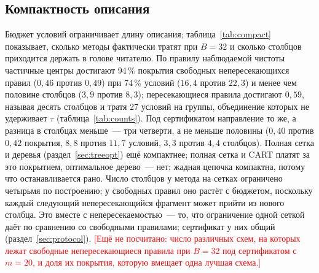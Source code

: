 \documentclass[11pt]{article}
\newcommand{\todo}[1]{\textcolor{red}{[#1]}}
\begin{document}
\subsection{Компактность описания}\label{sec:compact}
\begin{table}[t]\centering\small
\caption{Компактность при $B=32$ по информативным конфигурациям, на которых запускались все методы (\texttt{experiments/compactness.py}). Покрытие и потраченные условия~--- средние на отложенных строках по всем разбиениям; группы и различные столбцы, названные описанием, считаются на первом разбиении, поскольку набор столбцов не записывается по разбиениям. Дерево и SSD++ не записывают метки столбцов.}\label{tab:compact}

\end{table}

Бюджет условий ограничивает длину описания; таблица~\ref{tab:compact} показывает, сколько методы фактически тратят при $B=32$ и сколько столбцов приходится держать в голове читателю. По правилу наблюдаемой чистоты частичные центры достигают 94\,\% покрытия свободных непересекающихся правил ($0{,}46$ против $0{,}49$) при 74\,\% условий ($16{,}4$ против $22{,}3$) и менее чем половине столбцов ($3{,}9$ против $8{,}3$); пересекающиеся правила достигают $0{,}59$, называя десять столбцов и тратя $27$ условий на группы, объединение которых не удерживает $\tau$ (таблица~\ref{tab:counts}). Под сертификатом направление то же, а разница в столбцах меньше~--- три четверти, а не меньше половины ($0{,}40$ против $0{,}42$ покрытия, $8{,}8$ против $11{,}7$ условий, $3{,}3$ против $4{,}4$ столбцов). Полная сетка и деревья (раздел~\ref{sec:treeopt}) ещё компактнее; полная сетка и CART платят за это покрытием, оптимальное дерево~--- нет; жадная цепочка компактна, потому что останавливается рано. Число столбцов у метода на сетках ограничено четырьмя по построению; у свободных правил оно растёт с бюджетом, поскольку каждый следующий непересекающийся фрагмент может прийти из нового столбца. Это вместе с непересекаемостью~--- то, что ограничение одной сеткой даёт по сравнению со свободными правилами; сертификат у них общий (раздел~\ref{sec:protocol}). \todo{Ещё не посчитано: число различных схем, на которых лежат свободные непересекающиеся правила при $B=32$ под сертификатом с $m=20$, и доля их покрытия, которую вмещает одна лучшая схема.}
\end{document}
